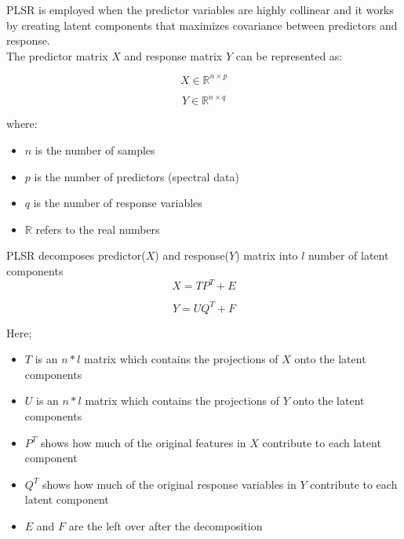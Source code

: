 \documentclass[12pt,a4paper]{report}
\begin{document}
PLSR is employed when the predictor variables are highly collinear and it works by creating latent components that maximizes covariance between predictors and response. \\

The predictor matrix \( X \) and response matrix \( Y \) can be represented as:

\begin{equation}
    X \in \mathbb{R}^{n \times p}
\end{equation}

\begin{equation}
    Y \in \mathbb{R}^{n \times q}
\end{equation}

where:
\begin{itemize}
    \item \( n \) is the number of samples
    \item \( p \) is the number of predictors (spectral data)
    \item \( q \) is the number of response variables
    \item $\mathbb{R}$ refers to the real numbers
\end{itemize}

PLSR decomposes predictor($X$) and response($Y$) matrix into $l$ number of latent components\\

\begin{equation}
    X = T P^T + E
\end{equation}

\begin{equation}
    Y = U Q^T + F
\end{equation}


Here;
\begin{itemize}
    \item $T$ is an $n*l$ matrix which contains the projections of $X$ onto the latent components
    \item $U$ is an $n*l$ matrix which contains the projections of $Y$ onto the latent components
    \item $P^T$ shows how much of the original features in $X$ contribute to each latent component
    \item $Q^T$ shows how much of the original response variables in $Y$ contribute to each latent component
    \item $E$ and $F$ are the left over after the decomposition
\end{itemize}
\end{document}
